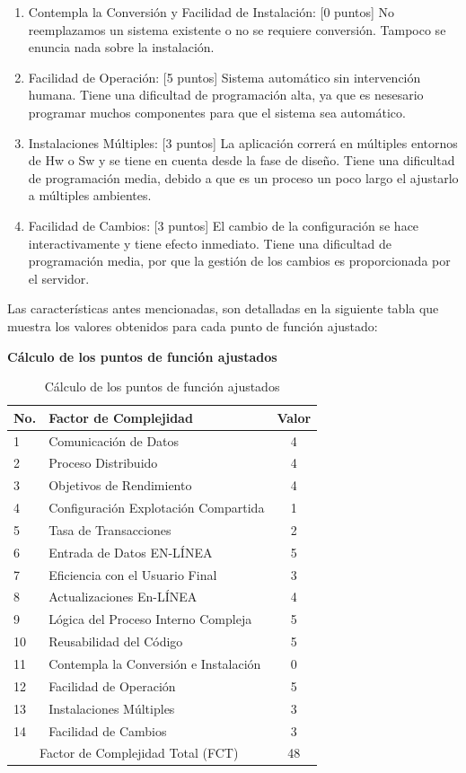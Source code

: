 \documentclass[a4paper,12pt,openany,oneside]{book}
\begin{document}
\begin{enumerate}
	\item Contempla la Conversión y Facilidad de Instalación: [0 puntos] No reemplazamos un sistema existente o no se requiere conversión. Tampoco se enuncia nada sobre la instalación.
	\item Facilidad de Operación: [5 puntos] Sistema automático sin intervención humana. Tiene una dificultad de programación alta, ya que es nesesario programar muchos componentes para que el sistema sea automático.
	\item Instalaciones Múltiples: [3 puntos] La aplicación correrá en múltiples entornos de Hw o Sw y se tiene en cuenta desde la fase de diseño. Tiene una dificultad de programación media, debido a que es un proceso un poco largo el ajustarlo a múltiples ambientes.
	\item Facilidad de Cambios: [3 puntos] El cambio de la configuración se hace interactivamente y tiene efecto inmediato. Tiene una dificultad de programación media, por que la gestión de los cambios es proporcionada por el servidor.
\end{enumerate}

Las características antes mencionadas, son detalladas en la siguiente tabla que muestra los valores obtenidos para cada punto de función ajustado:

\begin{table}[!ht]
\centering
\textbf{Cálculo de los puntos de función ajustados}\\
\begin{tabular}{| l | l | c |}
\hline
    \rowcolor{green!50}
\textbf{No.} & \textbf{Factor de Complejidad} & \textbf{Valor}\\
\hline
1 &  Comunicación de Datos & 4 \\
\hline
2 &  Proceso Distribuido &4  \\
\hline
3 & Objetivos de Rendimiento  &4  \\
\hline
4 & Configuración Explotación Compartida  & 1 \\
\hline
5 & Tasa de Transacciones  & 2 \\
\hline
6 &  Entrada de Datos EN-LÍNEA &  5\\
\hline
7 & Eficiencia con el Usuario Final  &  3\\
\hline
8 & Actualizaciones En-LÍNEA  & 4 \\
\hline
9 & Lógica del Proceso Interno Compleja  &  5\\
\hline
10 & Reusabilidad del Código  &  5\\
\hline
11&  Contempla la Conversión e Instalación &  0\\
\hline
12& Facilidad de Operación  &  5\\
\hline
13& Instalaciones Múltiples  &  3\\
\hline
14& Facilidad de Cambios  & 3 \\
\hline
\multicolumn{2}{|c|}{Factor de Complejidad Total (FCT)} & 48\\
\hline
\end{tabular}
\caption{Cálculo de los puntos de función ajustados}
\end{table}
\end{document}
